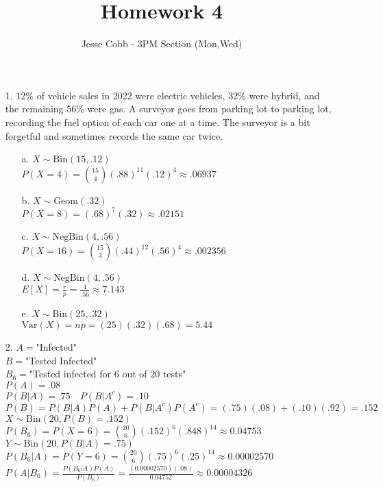 \documentclass[11pt]{amsart}
\theoremstyle{definition}
\begin{document}
\title{Homework 4}

\author{Jesse Cobb - 3PM Section (Mon,Wed)}

\maketitle

\begin{itemize}

\item[1.] 12\% of vehicle sales in 2022 were electric vehicles, 32\% were hybrid, and the remaining
56\% were gas. A surveyor goes from parking lot to parking lot, recording the fuel option of each car one at a time. The surveyor is a bit forgetful and sometimes records the same car twice.
\begin{itemize}
    \item[a.] $X\sim\text{Bin}(15,.12)$ \\
              $P(X=4)={15\choose 4}(.88)^{11}(.12)^4\approx.06937$

    \item[b.] $X\sim\text{Geom}(.32)$ \\
              $P(X=8)=(.68)^7(.32)\approx.02151$

    \item[c.] $X\sim\text{NegBin}(4,.56)$ \\
              $P(X=16)={15\choose 3}(.44)^{12}(.56)^4\approx.002356$

    \item[d.] $X\sim\text{NegBin}(4,.56)$ \\
              $E[X]=\frac{r}{p}=\frac{4}{.56}\approx7.143$

    \item[e.] $X\sim\text{Bin}(25,.32)$ \\
              $\text{Var}(X)=np=(25)(.32)(.68)=5.44$

\end{itemize}

\item[2.] $A=$"Infected"\\
          $B=$"Tested Infected"\\
          $B_6=$"Tested infected for $6$ out of $20$ tests" \\
          $P(A)=.08$ \\
          $P(B|A)=.75\quad P(B|A^c)=.10$ \\
          $P(B)=P(B|A)P(A)+P(B|A^c)P(A^c)=(.75)(.08)+(.10)(.92)=.152$ \\
          $X\sim\text{Bin}(20,P(B)=.152)$ \\
          $P(B_6)=P(X=6)={20\choose 6}(.152)^6(.848)^{14}\approx 0.04753$ \\
          $Y\sim\text{Bin}(20,P(B|A)=.75)$ \\
          $P(B_6|A)=P(Y=6)={20\choose 6}(.75)^6(.25)^{14}\approx 0.00002570$ \\
          $P(A|B_6)=\frac{P(B_6|A)P(A)}{P(B_6)}=\frac{(0.00002570)(.08)}{0.04752}\approx 0.00004326$


\end{itemize}
\end{document}
